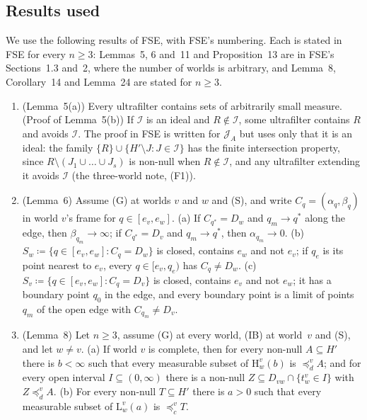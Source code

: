 \documentclass[11pt]{article}
\theoremstyle{definition}\newtheorem{definition}[theorem]{Definition}
\theoremstyle{remark}\newtheorem{remark}[theorem]{Remark}
\newcommand{\Jid}{\mathcal J}
\newcommand{\Iid}{\mathcal I}
\newcommand{\Lo}[3]{\mathrm L^{#1}_{#2}(#3)}
\newcommand{\Hi}[3]{\mathrm H^{#1}_{#2}(#3)}
\begin{document}
\subsection{Results used}\label{sec:inputs}

We use the following results of FSE, with FSE's numbering. Each is stated
in FSE for every $n\ge3$: Lemmas~5, 6 and~11 and Proposition~13 are in
FSE's Sections~1.3 and~2, where the number of worlds is arbitrary, and
Lemma~8, Corollary~14 and Lemma~24 are stated for $n\ge3$.
\begin{enumerate}[label=(F\arabic*),leftmargin=*,itemsep=3pt]
\item\label{in:uf} (Lemma~5(a)) Every ultrafilter contains sets of
arbitrarily small measure. (Proof of Lemma~5(b)) If $\Iid$ is an ideal and
$R\notin\Iid$, some ultrafilter contains $R$ and avoids $\Iid$. The proof
in FSE is written for $\Jid_A$ but uses only that it is an ideal: the
family $\{R\}\cup\{H'\setminus J:J\in\Iid\}$ has the finite intersection
property, since $R\setminus(J_1\cup\dots\cup J_s)$ is non-null when
$R\notin\Iid$, and any ultrafilter extending it avoids $\Iid$ (the
three-world note, (F1)).
\item\label{in:ends} (Lemma~6) Assume (G) at worlds $v$ and $w$ and (S),
and write $C_q=(\alpha_q,\beta_q)$ in world $v$'s frame for
$q\in[e_v,e_w]$. (a) If $C_{q^*}=D_w$ and $q_m\to q^*$ along the edge,
then $\beta_{q_m}\to\infty$; if $C_{q^*}=D_v$ and $q_m\to q^*$, then
$\alpha_{q_m}\to0$. (b) $S_w\coloneqq\{q\in[e_v,e_w]:C_q=D_w\}$ is closed,
contains $e_w$ and not $e_v$; if $q_e$ is its point nearest to $e_v$,
every $q\in[e_v,q_e)$ has $C_q\ne D_w$. (c)
$S_v\coloneqq\{q\in[e_v,e_w]:C_q=D_v\}$ is closed, contains $e_v$ and not
$e_w$; it has a boundary point $q_0$ in the edge, and every boundary point
is a limit of points $q_m$ of the open edge with $C_{q_m}\ne D_v$.
\item\label{in:yard} (Lemma~8) Let $n\ge3$, assume (G) at every world,
(IB) at world~$v$ and (S), and let $w\ne v$. (a) If world $v$ is complete,
then for every non-null $A\subseteq H'$ there is $b<\infty$ such that
every measurable subset of $\Hi vwb$ is $\preceq^v_dA$; and for every open
interval $I\subseteq(0,\infty)$ there is a non-null $Z\subseteq D_{vw}\cap
\{t^v_w\in I\}$ with $Z\preceq^v_dA$. (b) For every non-null $T\subseteq
H'$ there is $a>0$ such that every measurable subset of $\Lo vwa$ is
$\preceq^v_cT$.


\end{enumerate}
\end{document}
